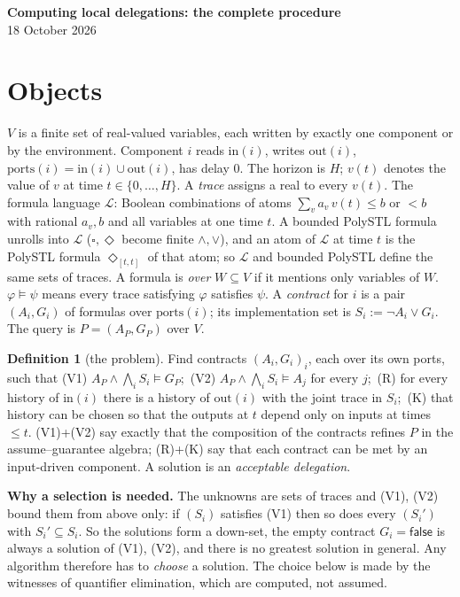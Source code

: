 \documentclass[10pt]{article}
\theoremstyle{plain}\newtheorem{theorem}{Theorem}\newtheorem{lemma}{Lemma}
\theoremstyle{definition}\newtheorem{definition}{Definition}
\newcommand{\inp}{\mathrm{in}}\newcommand{\outp}{\mathrm{out}}\newcommand{\ports}{\mathrm{ports}}\newcommand{\priv}{\mathrm{priv}}\newcommand{\edge}{\mathrm{edge}}
\begin{document}
\begin{center}\textbf{Computing local delegations: the complete procedure}\\ 18 October 2026\end{center}

\section{Objects}
$V$ is a finite set of real-valued variables, each written by exactly one component or by the environment. Component $i$ reads $\inp(i)$, writes $\outp(i)$, $\ports(i)=\inp(i)\cup\outp(i)$, has delay $0$. The horizon is $H$; $v(t)$ denotes the value of $v$ at time $t\in\{0,\dots,H\}$. A \emph{trace} assigns a real to every $v(t)$.
The formula language $\mathcal L$: Boolean combinations of atoms $\sum_v a_v\,v(t)\le b$ or $<b$ with rational $a_v,b$ and all variables at one time $t$. A bounded PolySTL formula unrolls into $\mathcal L$ ($\square,\Diamond$ become finite $\wedge,\vee$), and an atom of $\mathcal L$ at time $t$ is the PolySTL formula $\Diamond_{[t,t]}$ of that atom; so $\mathcal L$ and bounded PolySTL define the same sets of traces. A formula is \emph{over} $W\subseteq V$ if it mentions only variables of $W$. $\varphi\models\psi$ means every trace satisfying $\varphi$ satisfies $\psi$.
A \emph{contract} for $i$ is a pair $(A_i,G_i)$ of formulas over $\ports(i)$; its implementation set is $S_i:=\neg A_i\vee G_i$. The query is $P=(A_P,G_P)$ over $V$.
\begin{definition}[the problem]
Find contracts $(A_i,G_i)_{i}$, each over its own ports, such that
(V1) $A_P\wedge\bigwedge_iS_i\models G_P$;\ (V2) $A_P\wedge\bigwedge_iS_i\models A_j$ for every $j$;\ (R) for every history of $\inp(i)$ there is a history of $\outp(i)$ with the joint trace in $S_i$;\ (K) that history can be chosen so that the outputs at $t$ depend only on inputs at times $\le t$.
(V1)+(V2) say exactly that the composition of the contracts refines $P$ in the assume--guarantee algebra; (R)+(K) say that each contract can be met by an input-driven component. A solution is an \emph{acceptable delegation}.
\end{definition}
\textbf{Why a selection is needed.} The unknowns are sets of traces and (V1), (V2) bound them from above only: if $(S_i)$ satisfies (V1) then so does every $(S_i')$ with $S_i'\subseteq S_i$. So the solutions form a down-set, the empty contract $G_i=\mathsf{false}$ is always a solution of (V1), (V2), and there is no greatest solution in general. Any algorithm therefore has to \emph{choose} a solution. The choice below is made by the witnesses of quantifier elimination, which are computed, not assumed.
\end{document}
